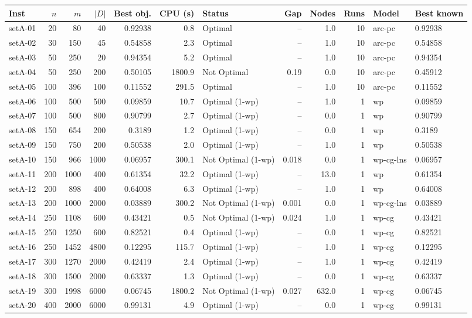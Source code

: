 \begin{tabular}{lrrrrrlrrrll}
\toprule
Inst & $n$ & $m$ & $|D|$ & Best obj. & CPU (s) & Status & Gap & Nodes & Runs & Model & Best known \\ \midrule
setA-01 & 20 & 80 & 40 & 0.92938 & 0.8 & Optimal & -- & 1.0 & 10 & arc-pc & 0.92938 \\
setA-02 & 30 & 150 & 45 & 0.54858 & 2.3 & Optimal & -- & 1.0 & 10 & arc-pc & 0.54858 \\
setA-03 & 50 & 250 & 20 & 0.94354 & 5.2 & Optimal & -- & 1.0 & 10 & arc-pc & 0.94354 \\
setA-04 & 50 & 250 & 200 & 0.50105 & 1800.9 & Not Optimal & 0.19 & 0.0 & 10 & arc-pc & 0.45912 \\
setA-05 & 100 & 396 & 100 & 0.11552 & 291.5 & Optimal & -- & 1.0 & 10 & arc-pc & 0.11552 \\
setA-06 & 100 & 500 & 500 & 0.09859 & 10.7 & Optimal (1-wp) & -- & 1.0 & 1 & wp & 0.09859 \\
setA-07 & 100 & 500 & 800 & 0.90799 & 2.7 & Optimal (1-wp) & -- & 0.0 & 1 & wp & 0.90799 \\
setA-08 & 150 & 654 & 200 & 0.3189 & 1.2 & Optimal (1-wp) & -- & 0.0 & 1 & wp & 0.3189 \\
setA-09 & 150 & 750 & 200 & 0.50538 & 2.0 & Optimal (1-wp) & -- & 1.0 & 1 & wp & 0.50538 \\
setA-10 & 150 & 966 & 1000 & 0.06957 & 300.1 & Not Optimal (1-wp) & 0.018 & 0.0 & 1 & wp-cg-lns & 0.06957 \\
setA-11 & 200 & 1000 & 400 & 0.61354 & 32.2 & Optimal (1-wp) & -- & 13.0 & 1 & wp & 0.61354 \\
setA-12 & 200 & 898 & 400 & 0.64008 & 6.3 & Optimal (1-wp) & -- & 1.0 & 1 & wp & 0.64008 \\
setA-13 & 200 & 1000 & 2000 & 0.03889 & 300.2 & Not Optimal (1-wp) & 0.001 & 0.0 & 1 & wp-cg-lns & 0.03889 \\
setA-14 & 250 & 1108 & 600 & 0.43421 & 0.5 & Not Optimal (1-wp) & 0.024 & 1.0 & 1 & wp-cg & 0.43421 \\
setA-15 & 250 & 1250 & 600 & 0.82521 & 0.4 & Optimal (1-wp) & -- & 0.0 & 1 & wp-cg & 0.82521 \\
setA-16 & 250 & 1452 & 4800 & 0.12295 & 115.7 & Optimal (1-wp) & -- & 1.0 & 1 & wp-cg & 0.12295 \\
setA-17 & 300 & 1270 & 2000 & 0.42419 & 2.4 & Optimal (1-wp) & -- & 1.0 & 1 & wp-cg & 0.42419 \\
setA-18 & 300 & 1500 & 2000 & 0.63337 & 1.3 & Optimal (1-wp) & -- & 0.0 & 1 & wp-cg & 0.63337 \\
setA-19 & 300 & 1998 & 6000 & 0.06745 & 1800.2 & Not Optimal (1-wp) & 0.027 & 632.0 & 1 & wp-cg & 0.06745 \\
setA-20 & 400 & 2000 & 6000 & 0.99131 & 4.9 & Optimal (1-wp) & -- & 0.0 & 1 & wp-cg & 0.99131 \\
\bottomrule
\end{tabular}

